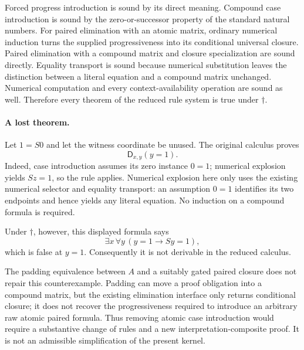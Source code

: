 \documentclass[11pt,letterpaper]{article}
\theoremstyle{definition}\newtheorem{definition}[theorem]{Definition}
\theoremstyle{remark}\newtheorem{remark}[theorem]{Remark}
\begin{document}
Forced progress introduction is sound by its direct meaning.
Compound case introduction is sound by the zero-or-successor property
of the standard natural numbers.  For paired elimination with an atomic
matrix, ordinary numerical induction turns the supplied progressiveness
into its conditional universal closure.  Paired elimination with a
compound matrix and closure specialization are sound directly.  Equality
transport is sound because numerical substitution leaves the distinction
between a literal equation and a compound matrix unchanged.  Numerical
computation and every context-availability operation are sound as well.
Therefore every theorem of the reduced rule system is true under
$\dagger$.

\paragraph{A lost theorem.}
Let $1=S0$ and let the witness coordinate be unused.  The original
calculus proves
\[
                   \mathsf D_{x,y}(y=1).
\]
Indeed, case introduction assumes its zero instance $0=1$; numerical
explosion yields $Sz=1$, so the rule applies.  Numerical explosion here
only uses the existing numerical selector and equality transport: an
assumption $0=1$ identifies its two endpoints and hence yields any
literal equation.  No induction on a compound formula is required.

Under $\dagger$, however, this displayed formula says
\[
                   \exists x\,\forall y\,(y=1\to Sy=1),
\]
which is false at $y=1$.  Consequently it is not derivable in the reduced
calculus.

The padding equivalence between $A$ and a suitably gated paired closure
does not repair this counterexample.  Padding can move a proof obligation
into a compound matrix, but the existing elimination interface only
returns conditional closure; it does not recover the progressiveness
required to introduce an arbitrary raw atomic paired formula.
Thus removing atomic case introduction would require a substantive
change of rules and a new interpretation-composite proof.  It is not an
admissible simplification of the present kernel.

\clearpage
\appendix
\end{document}
